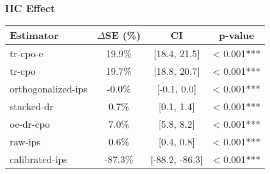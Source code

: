 \subsubsection{IIC Effect}
\begin{tabular}{l|ccc}
\toprule
Estimator & $\Delta$SE (\%) & CI & p-value \\
\midrule
tr-cpo-e & 19.9\% & [18.4, 21.5] & < 0.001*** \\
tr-cpo & 19.7\% & [18.8, 20.7] & < 0.001*** \\
orthogonalized-ips & -0.0\% & [-0.1, 0.0] & < 0.001*** \\
stacked-dr & 0.7\% & [0.1, 1.4] & < 0.001*** \\
oc-dr-cpo & 7.0\% & [5.8, 8.2] & < 0.001*** \\
raw-ips & 0.6\% & [0.4, 0.8] & < 0.001*** \\
calibrated-ips & -87.3\% & [-88.2, -86.3] & < 0.001*** \\
\bottomrule
\end{tabular}